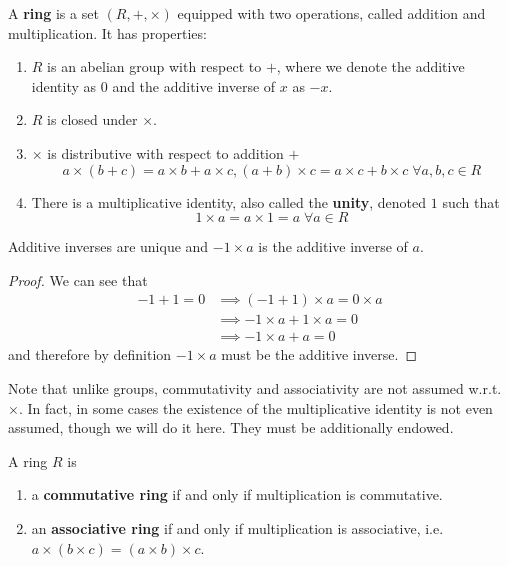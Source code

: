 \documentclass{article}
\begin{document}
    \begin{definition}[Ring]
      A \textbf{ring} is a set $(R, +, \times)$ equipped with two operations, called addition and multiplication. It has properties: 
      \begin{enumerate}
        \item $R$ is an abelian group with respect to $+$, where we denote the additive identity as $0$ and the additive inverse of $x$ as $-x$. 
        \item $R$ is closed under $\times$.
        \item $\times$ is distributive with respect to addition $+$
          \begin{equation}
            a \times (b + c) = a\times b + a\times c, (a+b)\times c = a\times c + b\times c \; \forall a, b, c \in R
          \end{equation}
        \item There is a multiplicative identity, also called the \textbf{unity}, denoted $1$ such that 
          \begin{equation}
            1 \times a = a \times 1 = a \; \forall a \in R
          \end{equation}
      \end{enumerate}
    \end{definition}

    \begin{lemma} 
      Additive inverses are unique and $-1 \times a$ is the additive inverse of $a$. 
    \end{lemma}
    \begin{proof}
      We can see that 
      \begin{align}
        -1 + 1 = 0 & \implies (-1 + 1) \times a = 0 \times a \\
                   & \implies -1 \times a + 1 \times a = 0 \\
                   & \implies -1 \times a + a = 0 
      \end{align}
      and therefore by definition $-1 \times a$ must be the additive inverse. 
    \end{proof}

    Note that unlike groups, commutativity and associativity are not assumed w.r.t. $\times$. In fact, in some cases the existence of the multiplicative identity is not even assumed, though we will do it here. They must be additionally endowed. 

    \begin{definition}
      A ring $R$ is 
      \begin{enumerate}
        \item a \textbf{commutative ring} if and only if multiplication is commutative. 
        \item an \textbf{associative ring} if and only if multiplication is associative, i.e. $a \times (b \times c) = (a \times b) \times c$. 
      \end{enumerate}
    \end{definition}
\end{document}

